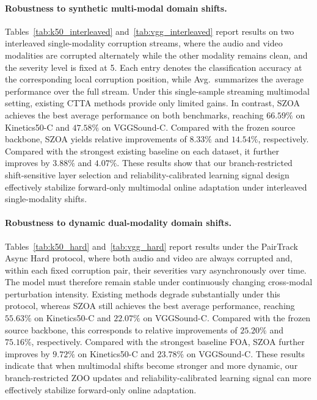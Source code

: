 \paragraph{Robustness to synthetic multi-modal domain shifts.}
Tables~\ref{tab:k50_interleaved} and~\ref{tab:vgg_interleaved} report results on two interleaved single-modality corruption streams, where the audio and video modalities are corrupted alternately while the other modality remains clean, and the severity level is fixed at 5. Each entry denotes the classification accuracy at the corresponding local corruption position, while Avg.\ summarizes the average performance over the full stream. Under this single-sample streaming multimodal setting, existing CTTA methods provide only limited gains. In contrast, SZOA achieves the best average performance on both benchmarks, reaching $66.59\%$ on Kinetics50-C and $47.58\%$ on VGGSound-C. Compared with the frozen source backbone, SZOA yields relative improvements of $8.33\%$ and $14.54\%$, respectively. Compared with the strongest existing baseline on each dataset, it further improves by $3.88\%$ and $4.07\%$. These results show that our branch-restricted shift-sensitive layer selection and reliability-calibrated learning signal design effectively stabilize forward-only multimodal online adaptation under interleaved single-modality shifts.

\paragraph{Robustness to dynamic dual-modality domain shifts.} Tables~\ref{tab:k50_hard} and~\ref{tab:vgg_hard} report results under the PairTrack Async Hard protocol, where both audio and video are always corrupted and, within each fixed corruption pair, their severities vary asynchronously over time. The model must therefore remain stable under continuously changing cross-modal perturbation intensity. Existing methods degrade substantially under this protocol, whereas SZOA still achieves the best average performance, reaching $55.63\%$ on Kinetics50-C and $22.07\%$ on VGGSound-C. Compared with the frozen source backbone, this corresponds to relative improvements of $25.20\%$ and $75.16\%$, respectively. Compared with the strongest baseline FOA, SZOA further improves by $9.72\%$ on Kinetics50-C and $23.78\%$ on VGGSound-C. These results indicate that when multimodal shifts become stronger and more dynamic, our branch-restricted ZOO updates and reliability-calibrated learning signal can more effectively stabilize forward-only online adaptation.




